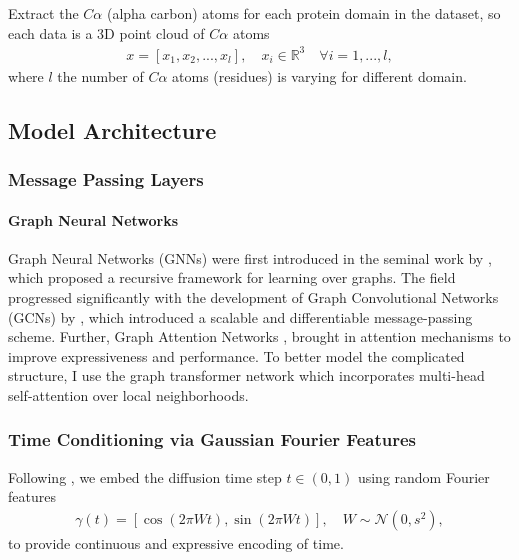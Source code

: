 \documentclass[a4paper,12pt]{article}
\begin{document}
Extract the \(C\alpha\) (alpha carbon) atoms for each protein domain in the dataset, so each data is a 3D point cloud of \(C\alpha\) atoms
\begin{align*}
    x = \left[x_1,x_2,...,x_l\right],\quad x_i\in\mathbb{R}^3\quad\forall i=1,...,l,
\end{align*}
where \(l\) the number of \(C\alpha\) atoms (residues) is varying for different domain.
\subsection{Model Architecture}
\subsubsection{Message Passing Layers}
\paragraph{Graph Neural Networks}
Graph Neural Networks (GNNs) were first introduced in the seminal work by \cite{scarselliGraphNeuralNetwork2009}, which proposed a recursive framework for learning over graphs. The field progressed significantly with the development of Graph Convolutional Networks (GCNs) by \cite{kipfSemiSupervisedClassificationGraph2017}, which introduced a scalable and differentiable message-passing scheme. Further, Graph Attention Networks \cite{velickovicGraphAttentionNetworks2018}, brought in attention mechanisms to improve expressiveness and performance. To better model the complicated structure, I use the graph transformer network \cite{shiMaskedLabelPrediction2021} which incorporates multi-head self-attention over local neighborhoods.
\subsubsection{Time Conditioning via Gaussian Fourier Features}
Following \cite{song2020score}, we embed the diffusion time step \(t\in\left(0,1\right)\) using random Fourier features \cite{tancikFourierFeaturesLet2020}
\begin{align*}
    \gamma\left(t\right)=\left[\cos\left(2\pi Wt\right),\sin\left(2\pi Wt\right)\right],\quad W\sim\mathcal{N}\left(0,s^2\right),
\end{align*}
to provide continuous and expressive encoding of time.
\end{document}
